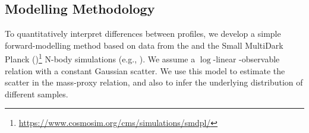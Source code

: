 \documentclass[fleqn,usenatbib,useAMS]{mnras}
\begin{document}
\subsection{Modelling Methodology}
    \label{sec:model}

    To quantitatively interpret differences between \dsigma{} profiles, we develop a simple
    forward-modelling method based on data from the  and the Small MultiDark Planck
    (\smdpl{})\footnote{\url{https://www.cosmosim.org/cms/simulations/smdpl/}} N-body simulations
    (e.g., \citealt{Klypin2016}).
    We assume a $\log$-linear \mvir{}-observable relation with a constant Gaussian scatter. 
    We use this model to estimate the scatter in the mass-proxy relation, and also to
    infer the underlying \mvir{} distribution of different samples.
\end{document}
